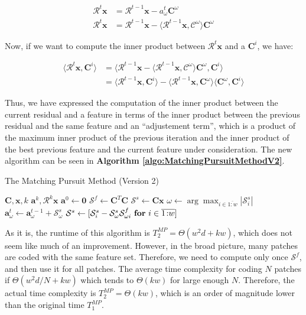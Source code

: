 \documentclass[12pt,a4paper,oneside,english]{UPBThesis}
\newcommand{\hcrange}[2]{\overline{{#1}\colon\!\!{#2}}}
\begin{document}
\begin{align*}
\mathcal{R}^t\textbf{x} & = \mathcal{R}^{t-1}\textbf{x} - a_\omega^t\textbf{C}^\omega \\
\mathcal{R}^t\textbf{x} & = \mathcal{R}^{t-1}\textbf{x} - \langle \mathcal{R}^{t-1}\textbf{x}, \mathcal{C}^\omega \rangle \textbf{C}^\omega
\end{align*}

Now, if we want to compute the inner product between $\mathcal{R}^t\textbf{x}$ and a $\textbf{C}^i$, we have:

\begin{align*}
\langle \mathcal{R}^t\textbf{x}, \textbf{C}^i \rangle & = \langle \mathcal{R}^{t-1}\textbf{x} - \langle \mathcal{R}^{t-1}\textbf{x}, \mathcal{C}^\omega \rangle \textbf{C}^\omega , \textbf{C}^i \rangle \\
& = \langle \mathcal{R}^{t-1}\textbf{x}, \textbf{C}^i \rangle - \langle \mathcal{R}^{t-1}\textbf{x}, \textbf{C}^\omega \rangle \langle \textbf{C}^\omega, \textbf{C}^i \rangle
\end{align*}

Thus, we have expressed the computation of the inner product between the current residual and a feature in terms of the inner product between the previous residual and the same feature and an ``adjustement term'', which is a product of the maximum inner product of the previous iteration and the inner product of the best previous feature and the current feature under consideration. The new algorithm can be seen in \textbf{Algorithm \ref{algo:MatchingPursuitMethodV2}}.

\begin{algorithm}
\caption{The Matching Pursuit Method (Version 2)}
\label{algo:MatchingPursuitMethodV2}
\begin{algorithmic}
\Require $\textbf{C},\textbf{x},k$
\Ensure $\textbf{a}^k,\mathcal{R}^k\textbf{x}$
\State $\textbf{a}^0 \gets \textbf{0}$
\State $\mathcal{S}^f \gets \textbf{C}^T\textbf{C}$
\State $\mathcal{S}^s \gets \textbf{C}\textbf{x}$
\For {$t = \hcrange{1}{k}$}
\State $\omega \gets \arg \max_{i \in \hcrange{1}{w}} \left| \mathcal{S}_i^s \right|$
\State $\textbf{a}_\omega^t \gets \textbf{a}_\omega^{t-1} + \mathcal{S}_\omega^s$
\State $\mathcal{S}^s \gets [ \mathcal{S}_i^s - \mathcal{S}_\omega^s \mathcal{S}_{\omega i}^f ~ \mbox{\textbf{for} $i \in \hcrange{1}{w}$} ]$
\EndFor
\end{algorithmic}
\end{algorithm}

As it is, the runtime of this algorithm is $T_2^{MP} = \Theta(w^2d + kw)$, which does not seem like much of an improvement. However, in the broad picture, many patches are coded with the same feature set. Therefore, we need to compute only once $\mathcal{S}^f$, and then use it for all patches. The average time complexity for coding $N$ patches if $\Theta(w^2d/N + kw)$ which tends to $\Theta(kw)$ for large enough $N$. Therefore, the actual time complexity is $T_2^{MP} = \Theta(kw)$, which is an order of magnitude lower than the original time $T_1^{MP}$.
\end{document}
